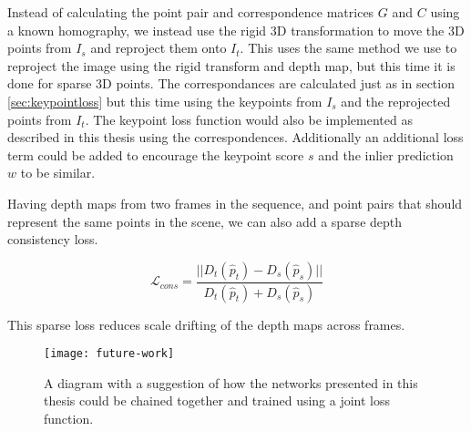 Instead of calculating the point pair and correspondence matrices $G$ and $C$ using a known homography, we instead use the rigid 3D transformation to move the 3D points from $I_s$ and reproject them onto $I_t$. This uses the same method we use to reproject the image using the rigid transform and depth map, but this time it is done for sparse 3D points. The correspondances are calculated just as in section \ref{sec:keypointloss} but this time using the keypoints from $I_s$ and the reprojected points from $I_t$. The keypoint loss function would also be implemented as described in this thesis using the correspondences. Additionally an additional loss term could be added to encourage the keypoint score $s$ and the inlier prediction $w$ to be similar.

Having depth maps from two frames in the sequence, and point pairs that should represent the same points in the scene, we can also add a sparse depth consistency loss.

\[
\mathcal{L}_{cons}=\frac{
||D_t(\hat{p}_t) - D_s(\hat{p}_s)||
}{
D_t(\hat{p}_t) + D_s(\hat{p}_s)
}
\]

This sparse loss reduces scale drifting of the depth maps across frames.

\begin{figure}[H]
	\centering
	\texttt{[image: future-work]}
	\caption{A diagram with a suggestion of how the networks presented in this thesis could be chained together and trained using a joint loss function.}
	\label{fig:futurework}
\end{figure}
